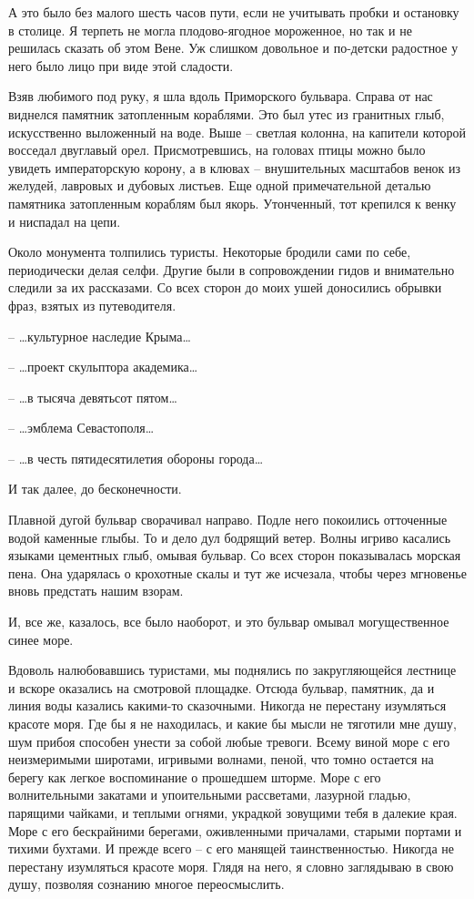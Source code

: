 \documentclass[
]{book}
\begin{document}
А это было без малого шесть часов пути, если не учитывать пробки и остановку в столице. Я терпеть не могла плодово-ягодное мороженное, но так и не решилась сказать об этом Вене. Уж слишком довольное и по-детски радостное у него было лицо при виде этой сладости.

Взяв любимого под руку, я шла вдоль Приморского бульвара. Справа от нас виднелся памятник затопленным кораблями. Это был утес из гранитных глыб, искусственно выложенный на воде. Выше -- светлая колонна, на капители которой восседал двуглавый орел. Присмотревшись, на головах птицы можно было увидеть императорскую корону, а в клювах -- внушительных масштабов венок из желудей, лавровых и дубовых листьев. Еще одной примечательной деталью памятника затопленным кораблям был якорь. Утонченный, тот крепился к венку и ниспадал на цепи.

Около монумента толпились туристы. Некоторые бродили сами по себе, периодически делая селфи. Другие были в сопровождении гидов и внимательно следили за их рассказами. Со всех сторон до моих ушей доносились обрывки фраз, взятых из путеводителя.

-- \ldots культурное наследие Крыма\ldots{}

-- \ldots проект скульптора академика\ldots{}

-- \ldots в тысяча девятьсот пятом\ldots{}

-- \ldots эмблема Севастополя\ldots{}

-- \ldots в честь пятидесятилетия обороны города\ldots{}

И так далее, до бесконечности.

Плавной дугой бульвар сворачивал направо. Подле него покоились отточенные водой каменные глыбы. То и дело дул бодрящий ветер. Волны игриво касались языками цементных глыб, омывая бульвар. Со всех сторон показывалась морская пена. Она ударялась о крохотные скалы и тут же исчезала, чтобы через мгновенье вновь предстать нашим взорам.

И, все же, казалось, все было наоборот, и это бульвар омывал могущественное синее море.

Вдоволь налюбовавшись туристами, мы поднялись по закругляющейся лестнице и вскоре оказались на смотровой площадке. Отсюда бульвар, памятник, да и линия воды казались какими-то сказочными. Никогда не перестану изумляться красоте моря. Где бы я не находилась, и какие бы мысли не тяготили мне душу, шум прибоя способен унести за собой любые тревоги. Всему виной море с его неизмеримыми широтами, игривыми волнами, пеной, что томно остается на берегу как легкое воспоминание о прошедшем шторме. Море с его волнительными закатами и упоительными рассветами, лазурной гладью, парящими чайками, и теплыми огнями, украдкой зовущими тебя в далекие края. Море с его бескрайними берегами, оживленными причалами, старыми портами и тихими бухтами. И прежде всего -- с его манящей таинственностью. Никогда не перестану изумляться красоте моря. Глядя на него, я словно заглядываю в свою душу, позволяя сознанию многое переосмыслить.
\end{document}

